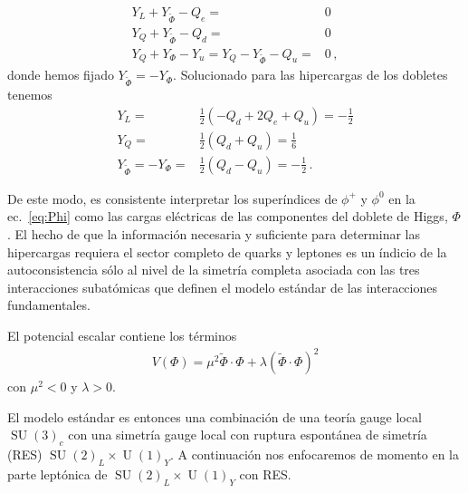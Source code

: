 \begin{frame}
\begin{align*}
  Y_L+Y_{\widetilde{\Phi}}-Q_{e}=&0\\
  Y_Q+Y_{\widetilde{\Phi}}-Q_{d}=&0\\
  Y_Q+Y_{\Phi}-Y_{u}=Y_Q-Y_{\widetilde{\Phi}}-Q_{u}=&0\,,
\end{align*}
donde hemos fijado $Y_{\widetilde{\Phi}}=-Y_\Phi$. Solucionado para las hipercargas de los dobletes tenemos
\begin{align}
\label{eq:yyy}
Y_L=&\frac{1}{2}\left( -Q_d+2Q_e+Q_u \right)=-\frac{1}{2}  \nonumber\\
Y_Q=&\frac{1}{2}\left( Q_d+Q_u \right)=\frac{1}{6} \nonumber\\
Y_{\widetilde{\Phi}}=-Y_{\Phi}=&\frac{1}{2}\left( Q_d-Q_u \right)=-\frac{1}{2}\,.
\end{align}

De este modo, es consistente interpretar los superíndices de $\phi^+$ y $\phi^0$ en la ec.~\eqref{eq:Phi} como las cargas eléctricas de las componentes del doblete de Higgs, $\Phi$. El hecho de que la información necesaria y suficiente para determinar las hipercargas requiera el sector completo de quarks y leptones es un índicio de la autoconsistencia sólo al nivel de la simetría completa asociada con las tres interacciones subatómicas que definen el modelo estándar de las interacciones fundamentales.

\end{frame}

El potencial escalar contiene los términos
\begin{align}
  V(\Phi)=\mu^2\widetilde{\Phi}\cdot\Phi+\lambda \left( \widetilde{\Phi}\cdot\Phi \right)^2 
\end{align}
con $\mu^2<0$ y $\lambda>0$. %


El modelo estándar es entonces una combinación de una teoría gauge local $\operatorname{SU}(3)_{c}$ con una simetría gauge local con ruptura espontánea de simetría (RES) $\operatorname{SU}(2)_L\times \operatorname{U}(1)_Y$. A continuación nos enfocaremos de momento en la parte leptónica de  $\operatorname{SU}(2)_L\times \operatorname{U}(1)_Y$ con RES.

